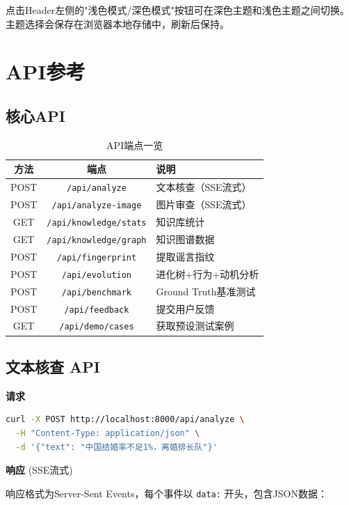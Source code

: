 \documentclass[12pt,a4paper]{ctexart}
\begin{document}
点击Header左侧的"浅色模式/深色模式"按钮可在深色主题和浅色主题之间切换。主题选择会保存在浏览器本地存储中，刷新后保持。

\section{API参考}

\subsection{核心API}

\begin{table}[h]
\centering
\begin{tabular}{|c|c|l|}
\hline
\textbf{方法} & \textbf{端点} & \textbf{说明} \\
\hline
POST & \texttt{/api/analyze} & 文本核查（SSE流式） \\
POST & \texttt{/api/analyze-image} & 图片审查（SSE流式） \\
GET & \texttt{/api/knowledge/stats} & 知识库统计 \\
GET & \texttt{/api/knowledge/graph} & 知识图谱数据 \\
POST & \texttt{/api/fingerprint} & 提取谣言指纹 \\
POST & \texttt{/api/evolution} & 进化树+行为+动机分析 \\
POST & \texttt{/api/benchmark} & Ground Truth基准测试 \\
POST & \texttt{/api/feedback} & 提交用户反馈 \\
GET & \texttt{/api/demo/cases} & 获取预设测试案例 \\
\hline
\end{tabular}
\caption{API端点一览}
\end{table}

\subsection{文本核查 API}

\textbf{请求}
\begin{lstlisting}[language=bash]
curl -X POST http://localhost:8000/api/analyze \
  -H "Content-Type: application/json" \
  -d '{"text": "中国结婚率不足1%，离婚排长队"}'
\end{lstlisting}

\textbf{响应} (SSE流式)

响应格式为Server-Sent Events，每个事件以 \texttt{data:} 开头，包含JSON数据：
\end{document}
